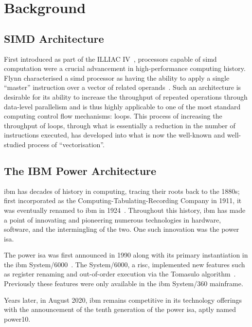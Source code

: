 \documentclass[\main/thesis.tex]{subfiles}
\begin{document}
\chapter{Background}
\label{cha:background}

\section{SIMD Architecture}
\label{sec:simd}
First introduced as part of the ILLIAC IV~\autocite{barnes1968illiac}, processors capable of \gls{simd} computation were a crucial advancement in high-performance computing history.
Flynn characterised a \gls{simd} processor as having the ability to apply a single ``master'' instruction over a vector of related operands~\autocite{flynn1972some}.
Such an architecture is desirable for its ability to increase the throughput of repeated operations through data-level parallelism and is thus highly applicable to one of the most standard computing control flow mechanisms: loops.
This process of increasing the throughput of loops, through what is essentially a reduction in the number of instructions executed, has developed into what is now the well-known and well-studied process of ``\gls{vectorisation}''.

\section{The IBM Power Architecture}
\Gls{ibm} has decades of history in computing, tracing their roots back to the 1880s; first incorporated as the Computing-Tabulating-Recording Company in 1911, it was eventually renamed to \gls{ibm} in 1924~\autocite{ibmarchive}.
Throughout this history, \gls{ibm} has made a point of innovating and pioneering numerous technologies in hardware, software, and the intermingling of the two.
One such innovation was the \gls{power} \gls{isa}.

The \gls{power} \gls{isa} was first announced in 1990 along with its primary instantiation in the \gls{ibm} System/6000~\autocite{montoye1990design}.
The System/6000, a \gls{risc}, implemented new features such as register renaming and out-of-order execution via the Tomasulo algorithm~\autocite{tomasulo1967efficient}.
Previously these features were only available in the \gls{ibm} System/360 mainframe.

Years later, in August 2020, \gls{ibm} remains competitive in its technology offerings with the announcement of the tenth generation of the \gls{power} \gls{isa}, aptly named \gls{power10}.
\end{document}
